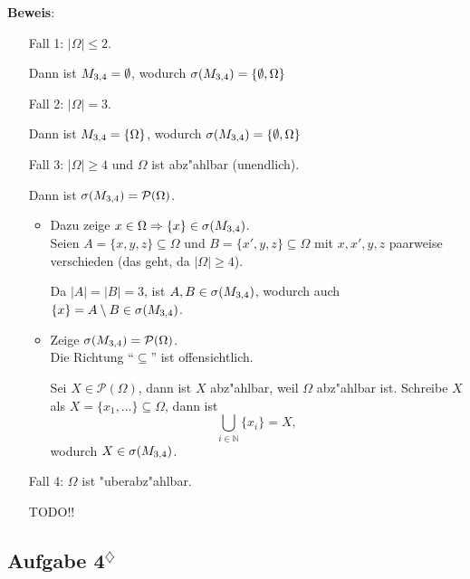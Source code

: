 \documentclass[11pt,a4paper,ngerman]{article}
\newcommand{\set}[1]{ \{ #1 \}}
\newcommand{\N}{\mathbb{N}}
\newcommand{\Pot}{\mathcal{P}}
\newcommand{\abs}[1]{ |#1|}
\newcommand{\marcel}{$^\diamondsuit$}
\begin{document}
\textbf{Beweis}:

\begin{itemize}
  \item[Fall 1:] $\abs{\Omega} \le 2$.

    Dann ist $M_{3,4} = \emptyset$, wodurch $\sigma(\SetM) = \set{\emptyset,
    \Omega}$

  \item[Fall 2:] $\abs{\Omega} = 3$.

    Dann ist $\SetM = \set{\Omega}$, wodurch $\sigma(\SetM) = \set{\emptyset,
    \Omega}$

  \item[Fall 3:] $\abs{\Omega} \ge 4$ und $\Omega$ ist abz"ahlbar (unendlich).

    Dann ist $\sigma(\SetM) = \Pot(\Omega)$.

    \begin{itemize}
      \item Dazu zeige $x \in \Omega \Rightarrow \set x \in \sigma(\SetM)$. \\

        Seien $A = \set{x, y, z} \subseteq \Omega$ und $B = \set{x', y, z}
        \subseteq \Omega$ mit $x,x',y,z$ paarweise verschieden (das geht, da
        $\abs{\Omega} \ge 4$).

        Da $\abs{A} = \abs{B} = 3$, ist $A,B \in \sigma(M_{3,4})$, wodurch auch
        $\set x = A\setminus B \in \sigma(\SetM)$.

      \item Zeige $\sigma(\SetM) = \Pot(\Omega)$. \\

        Die Richtung ``$\subseteq$'' ist offensichtlich.

        Sei $X \in \Pot(\Omega)$, dann ist $X$ abz"ahlbar, weil $\Omega$
        abz"ahlbar ist. Schreibe $X$ als $X = \set{x_1, \ldots} \subseteq
        \Omega$, dann ist \[
          \bigcup_{i\in\N} \set{x_i} = X,
        \]
        wodurch $X \in \sigma(M_{3,4})$.

    \end{itemize}

  \item[Fall 4:] $\Omega$ ist "uberabz"ahlbar.

    TODO!!

\end{itemize}

\subsection*{Aufgabe 4\marcel}
\end{document}
